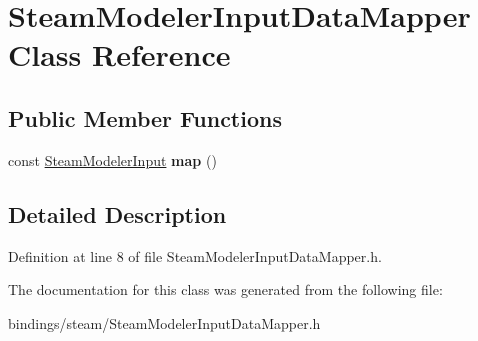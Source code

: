 \hypertarget{class_steam_modeler_input_data_mapper}{}\section{Steam\+Modeler\+Input\+Data\+Mapper Class Reference}
\label{class_steam_modeler_input_data_mapper}
\subsection*{Public Member Functions}
\begin{DoxyCompactItemize}
\item 
\mbox{\label{class_steam_modeler_input_data_mapper_a5e218b950ef274120e7b84d0ab818380}} 
const \hyperlink{class_steam_modeler_input}{Steam\+Modeler\+Input} {\bfseries map} ()
\end{DoxyCompactItemize}


\subsection{Detailed Description}


Definition at line 8 of file Steam\+Modeler\+Input\+Data\+Mapper.\+h.



The documentation for this class was generated from the following file\+:\begin{DoxyCompactItemize}
\item 
bindings/steam/Steam\+Modeler\+Input\+Data\+Mapper.\+h\end{DoxyCompactItemize}
